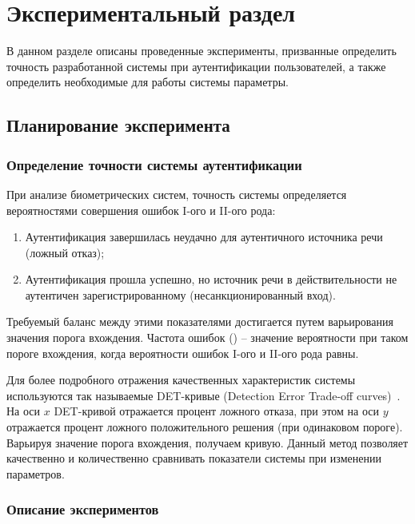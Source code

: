 \chapter{Экспериментальный раздел}
\label{sec:experiment}

В данном разделе описаны проведенные эксперименты, призванные определить
точность разработанной системы при аутентификации пользователей, а также
определить необходимые для работы системы параметры.

\section{Планирование эксперимента}

\subsection{Определение точности системы аутентификации}

При анализе биометрических систем, точность системы
определяется вероятностями совершения ошибок I-ого и II-ого рода:

\begin{enumerate}
\item Аутентификация завершилась неудачно для аутентичного источника речи (ложный отказ);
\item Аутентификация прошла успешно, но источник речи в действительности не аутентичен зарегистрированному (несанкционированный вход).
\end{enumerate}

Требуемый баланс между этими показателями достигается путем варьирования
значения порога вхождения. Частота ошибок () --
значение вероятности при таком пороге вхождения, когда вероятности ошибок I-ого
и II-ого рода равны.

Для более подробного отражения качественных характеристик системы используются
так называемые DET-кривые (Detection Error Trade-off curves)~\cite{Alvin97DET}. На оси $x$
DET-кривой отражается процент ложного отказа, при этом на оси $y$ отражается
процент ложного положительного решения (при одинаковом пороге). Варьируя
значение порога вхождения, получаем кривую. Данный метод позволяет качественно и
количественно сравнивать
показатели системы при изменении параметров.

\subsection{Описание экспериментов}

